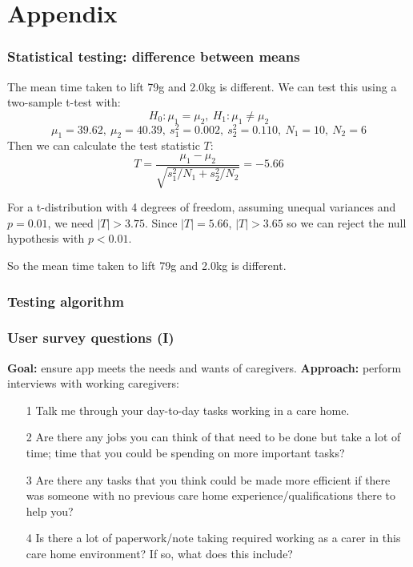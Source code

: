 \documentclass{beamer}
\begin{document}
\section{Appendix}
\begin{frame}
  \frametitle{Statistical testing: difference between means}
  The mean time taken to lift 79g and 2.0kg is different. We can test this using a two-sample t-test with:
  $$H_0: \mu_1 = \mu_2,\ H_1: \mu_1 \neq \mu_2 $$
  $$ \mu_1 = 39.62,\ \mu_2 = 40.39,\ s^2_1 = 0.002,\ s^2_2 = 0.110,\ N_1 = 10,\ N_2 = 6$$
  Then we can calculate the test statistic $T$:
  $$T = \frac{\mu_1 - \mu_2}{\sqrt{s^2_1 / N_1 + s^2_2 / N_2}} = -5.66$$

  For a t-distribution with 4 degrees of freedom, assuming unequal variances and $p = 0.01$, we need $|T| > 3.75$. Since $|T| = 5.66$, $|T| > 3.65$ so we can reject the null hypothesis with $p < 0.01$.

  So the mean time taken to lift 79g and 2.0kg is different. 
\end{frame}

\begin{frame}
  \frametitle{Testing algorithm}
  \begin{algorithm}[H]
  \end{algorithm}
\end{frame}
\begin{frame}
  \frametitle{User survey questions (I)}
  {\bf Goal: } ensure app meets the needs and wants of caregivers.
  {\bf Approach: } perform interviews with working caregivers: 
  \begin{enumerate}
    \item[1] Talk me through your day-to-day tasks working in a care home.
    \item[2] Are there any jobs you can think of that need to be done but take a lot of time; time that you could be spending on more important tasks?
    \item[3] Are there any tasks that you think could be made more efficient if there was someone with no previous care home experience/qualifications there to help you?
    \item[4]  Is there a lot of paperwork/note taking required working as a carer in this care home environment? If so, what does this include?
  \end{enumerate}
\end{frame}
\end{document}
